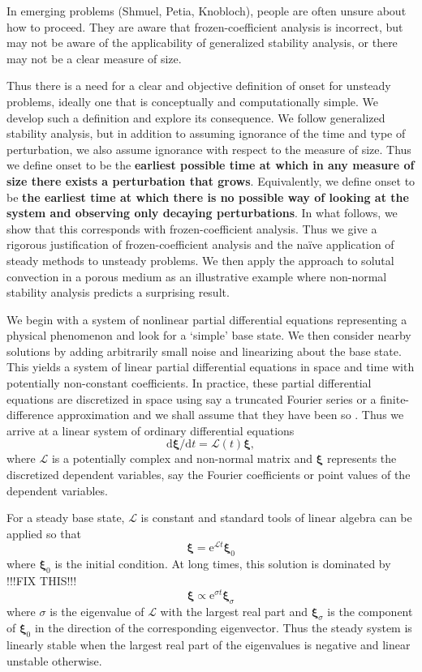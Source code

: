 \documentclass[letterpaper,prl,aps,preprint,superscriptaddress]{revtex4-1}
\newcommand{\cL}{\boldsymbol{\mathcal{L}}}
\newcommand{\prt}{\boldsymbol{\xi}}
\begin{document}
In emerging problems (Shmuel, Petia, Knobloch), people are often unsure about how to proceed.  They are aware that frozen-coefficient analysis is incorrect, but may not be aware of the applicability of generalized stability analysis, or there may not be a clear measure of size.

Thus there is a need for a clear and objective definition of onset for unsteady problems, ideally one that is conceptually and computationally simple.  We develop such a definition and explore its consequence.  We follow generalized stability analysis, but in addition to assuming ignorance of the time and type of perturbation, we also assume ignorance with respect to the measure of size.  Thus we define onset to be the {\bf earliest possible time at which in any measure of size there exists a perturbation that grows}.  Equivalently, we define onset to be {\bf the earliest time at which there is no possible way of looking at the system and observing only decaying perturbations}.  In what follows, we show that this corresponds with frozen-coefficient analysis.  Thus we give a rigorous justification of frozen-coefficient analysis and the na\"ive application of steady methods to unsteady problems.  We then apply the approach to solutal convection in a porous medium as an illustrative example where non-normal stability analysis predicts a surprising result.

We begin with a system of nonlinear partial differential equations representing a physical phenomenon and look for a `simple' base state.  We then consider nearby solutions by adding arbitrarily small noise and linearizing about the base state.  This yields a system of linear partial differential equations in space and time with potentially non-constant coefficients.  In practice, these partial differential equations are discretized in space using say a truncated Fourier series or a finite-difference approximation and we shall assume that they have been so \cite{FarrellIoannou}.  Thus we arrive at a linear system of ordinary differential equations
\[
{\text{d}\prt}/{\text{d} t} = \cL(t)\prt,
\]
where $\cL$ is a potentially complex and non-normal matrix and $\prt$ represents the discretized dependent variables, say the Fourier coefficients or point values of the dependent variables.  

For a steady base state, $\cL$ is constant and standard tools of linear algebra can be applied so that
\[
\prt = \text{e}^{\cL t}\prt_0
\]
where $\prt_0$ is the initial condition.  At long times, this solution is dominated by !!!FIX THIS!!!
\[
\prt \propto \text{e}^{\sigma t}\prt_\sigma
\]
where $\sigma$ is the eigenvalue of $\cL$ with the largest real part and $\prt_\sigma$ is the component of $\prt_0$ in the direction of the corresponding eigenvector.  Thus the steady system is linearly stable when the largest real part of the eigenvalues is negative and linear unstable otherwise.
\end{document}

